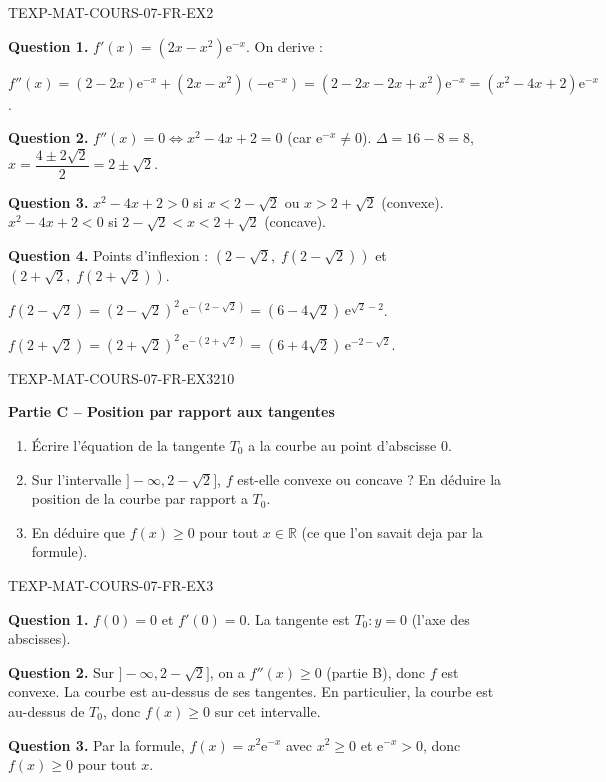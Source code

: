 \begin{corrige}{TEXP-MAT-COURS-07-FR-EX2}

\textbf{Question 1.} $f'(x) = (2x - x^2)\mathrm{e}^{-x}$. On derive :

$f''(x) = (2 - 2x)\mathrm{e}^{-x} + (2x - x^2)(-\mathrm{e}^{-x}) = (2 - 2x - 2x + x^2)\mathrm{e}^{-x} = (x^2 - 4x + 2)\mathrm{e}^{-x}$.

\textbf{Question 2.} $f''(x) = 0 \iff x^2 - 4x + 2 = 0$ (car $\mathrm{e}^{-x}
\neq 0$). $\Delta = 16 - 8 = 8$, $x = \dfrac{4 \pm 2\sqrt{2}}{2} = 2 \pm \sqrt{2}$.

\textbf{Question 3.} $x^2 - 4x + 2 > 0$ si $x < 2 - \sqrt{2}$ ou $x > 2 + \sqrt{2}$ (convexe). $x^2 - 4x + 2 < 0$ si $2 - \sqrt{2} < x < 2 + \sqrt{2}$ (concave).

\textbf{Question 4.} Points d'inflexion : $(2 - \sqrt{2},\; f(2-\sqrt{2}))$ et $(2 + \sqrt{2},\; f(2+\sqrt{2}))$.

$f(2-\sqrt{2}) = (2-\sqrt{2})^2\,\mathrm{e}^{-(2-\sqrt{2})} = (6-4\sqrt{2})\,\mathrm{e}^{\sqrt{2}-2}$.

$f(2+\sqrt{2}) = (2+\sqrt{2})^2\,\mathrm{e}^{-(2+\sqrt{2})} = (6+4\sqrt{2})\,\mathrm{e}^{-2-\sqrt{2}}$.

\end{corrige}

\bigskip


\begin{exercice}{TEXP-MAT-COURS-07-FR-EX3}{2}{10}

\textbf{Partie C -- Position par rapport aux tangentes}

\begin{enumerate}
  \item Écrire l'équation de la tangente $T_0$ a la courbe au point d'abscisse $0$.
  \item Sur l'intervalle $]-\infty, 2 - \sqrt{2}]$, $f$ est-elle convexe ou concave ? En déduire la position de la courbe par rapport a $T_0$.
  \item En déduire que $f(x) \geq 0$ pour tout $x \in \mathbb{R}$ (ce que l'on savait deja par la formule).
\end{enumerate}

\end{exercice}

\begin{corrige}{TEXP-MAT-COURS-07-FR-EX3}

\textbf{Question 1.} $f(0) = 0$ et $f'(0) = 0$. La tangente est $T_0 : y = 0$ (l'axe des abscisses).

\textbf{Question 2.} Sur $]-\infty, 2 - \sqrt{2}]$, on a $f''(x) \geq 0$ (partie B), donc $f$ est convexe. La courbe est au-dessus de ses tangentes. En particulier, la courbe est au-dessus de $T_0$, donc $f(x) \geq 0$ sur cet intervalle.

\textbf{Question 3.} Par la formule, $f(x) = x^2 \mathrm{e}^{-x}$ avec $x^2 \geq 0$ et $\mathrm{e}^{-x} > 0$, donc $f(x) \geq 0$ pour tout $x$.

\end{corrige}
